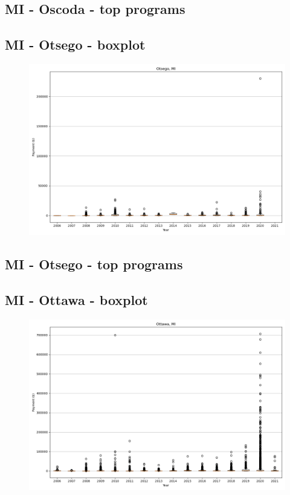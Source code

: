 \subsection*{MI - Oscoda - top programs}

\newpage
\subsection*{MI - Otsego - boxplot}
\begin{figure}[h]
\centering
\includegraphics[width=7in]{../output/boxplots/counties/Otsego-MI_boxplot.png}
\end{figure}


\subsection*{MI - Otsego - top programs}

\newpage
\subsection*{MI - Ottawa - boxplot}
\begin{figure}[h]
\centering
\includegraphics[width=7in]{../output/boxplots/counties/Ottawa-MI_boxplot.png}
\end{figure}


